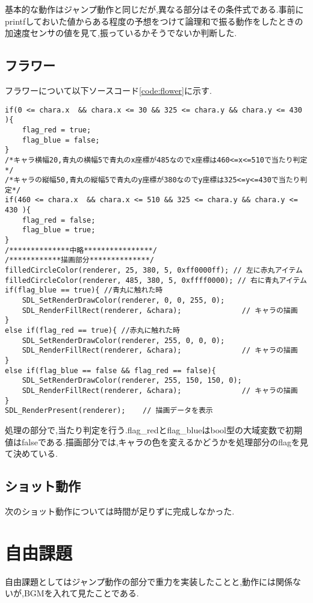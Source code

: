 \documentclass{jarticle}
\begin{document}
基本的な動作はジャンプ動作と同じだが,異なる部分はその条件式である.事前にprintfしておいた値からある程度の予想をつけて論理和で振る動作をしたときの加速度センサの値を見て,振っているかそうでないか判断した.

\subsection{フラワー}
フラワーについて以下ソースコード\ref{code:flower}に示す.

\begin{lstlisting}[caption = フラワー,label=code:flower]
if(0 <= chara.x  && chara.x <= 30 && 325 <= chara.y && chara.y <= 430 ){
	flag_red = true;
	flag_blue = false;
}
/*キャラ横幅20,青丸の横幅5で青丸のx座標が485なのでx座標は460<=x<=510で当たり判定*/
/*キャラの縦幅50,青丸の縦幅5で青丸のy座標が380なのでy座標は325<=y<=430で当たり判定*/
if(460 <= chara.x  && chara.x <= 510 && 325 <= chara.y && chara.y <= 430 ){
	flag_red = false;
	flag_blue = true;
}
/**************中略****************/
/************描画部分**************/
filledCircleColor(renderer, 25, 380, 5, 0xff0000ff); // 左に赤丸アイテム
filledCircleColor(renderer, 485, 380, 5, 0xffff0000); // 右に青丸アイテム
if(flag_blue == true){ //青丸に触れた時
	SDL_SetRenderDrawColor(renderer, 0, 0, 255, 0);
	SDL_RenderFillRect(renderer, &chara);              // キャラの描画
}
else if(flag_red == true){ //赤丸に触れた時
	SDL_SetRenderDrawColor(renderer, 255, 0, 0, 0);
	SDL_RenderFillRect(renderer, &chara);              // キャラの描画
}
else if(flag_blue == false && flag_red == false){
	SDL_SetRenderDrawColor(renderer, 255, 150, 150, 0);
	SDL_RenderFillRect(renderer, &chara);              // キャラの描画
}
SDL_RenderPresent(renderer);	// 描画データを表示
\end{lstlisting}

処理の部分で,当たり判定を行う.flag\_redとflag\_blueはbool型の大域変数で初期値はfalseである.描画部分では,キャラの色を変えるかどうかを処理部分のflagを見て決めている.

\subsection{ショット動作}
次のショット動作については時間が足りずに完成しなかった.
\section{自由課題}
自由課題としてはジャンプ動作の部分で重力を実装したことと,動作には関係ないが,BGMを入れて見たことである.
\end{document}
